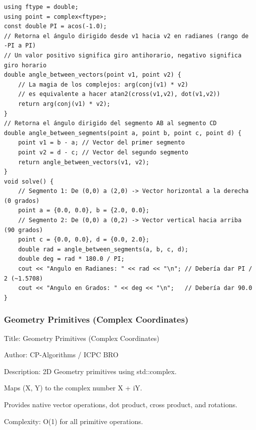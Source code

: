 \documentclass[10pt,landscape,twocolumn]{article}
\begin{document}
\begin{lstlisting}
using ftype = double; 
using point = complex<ftype>;
const double PI = acos(-1.0);
// Retorna el ángulo dirigido desde v1 hacia v2 en radianes (rango de -PI a PI)
// Un valor positivo significa giro antihorario, negativo significa giro horario
double angle_between_vectors(point v1, point v2) {
    // La magia de los complejos: arg(conj(v1) * v2) 
    // es equivalente a hacer atan2(cross(v1,v2), dot(v1,v2))
    return arg(conj(v1) * v2);
}
// Retorna el ángulo dirigido del segmento AB al segmento CD
double angle_between_segments(point a, point b, point c, point d) {
    point v1 = b - a; // Vector del primer segmento
    point v2 = d - c; // Vector del segundo segmento
    return angle_between_vectors(v1, v2);
}
void solve() {
    // Segmento 1: De (0,0) a (2,0) -> Vector horizontal a la derecha (0 grados)
    point a = {0.0, 0.0}, b = {2.0, 0.0};
    // Segmento 2: De (0,0) a (0,2) -> Vector vertical hacia arriba (90 grados)
    point c = {0.0, 0.0}, d = {0.0, 2.0};
    double rad = angle_between_segments(a, b, c, d);
    double deg = rad * 180.0 / PI;
    cout << "Angulo en Radianes: " << rad << "\n"; // Debería dar PI / 2 (~1.5708)
    cout << "Angulo en Grados: " << deg << "\n";   // Debería dar 90.0
}
\end{lstlisting}

\subsubsection{Geometry Primitives (Complex Coordinates)}
\begin{flushleft}
\footnotesize\ttfamily
\par\noindent Title: Geometry Primitives (Complex Coordinates)
\par\noindent Author: CP-Algorithms / ICPC BRO
\par\noindent Description: 2D Geometry primitives using std::complex.
\par\noindent Maps (X, Y) to the complex number X + iY.
\par\noindent Provides native vector operations, dot product, cross product, and rotations.
\par\noindent Complexity: O(1) for all primitive operations.
\end{flushleft}
\end{document}
